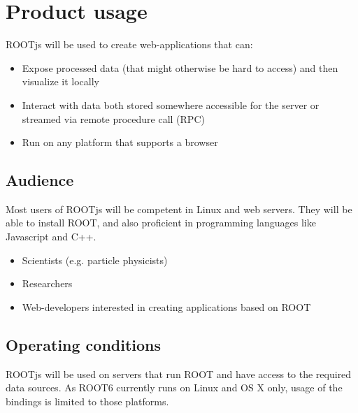 \chapter{Product usage}

ROOTjs will be used to create web-applications that can:
\begin{itemize}
	\item Expose processed data (that might otherwise be hard to access) and then visualize it locally
	\item Interact with data both stored somewhere accessible for the server or streamed via remote procedure call (RPC)
	\item Run on any platform that supports a browser
\end{itemize}


\section{Audience}
Most users of ROOTjs will be competent in Linux and web servers. They will be able to install ROOT, and also proficient in programming languages like Javascript and C++.
\begin{itemize}
	\item Scientists (e.g. particle physicists)
	\item Researchers
	\item Web-developers interested in creating applications based on ROOT
\end{itemize}

\section{Operating conditions}

ROOTjs will be used on servers that run ROOT and have access to the required data sources. As ROOT6 currently runs on Linux and OS X only, usage of the bindings is limited to those platforms.
